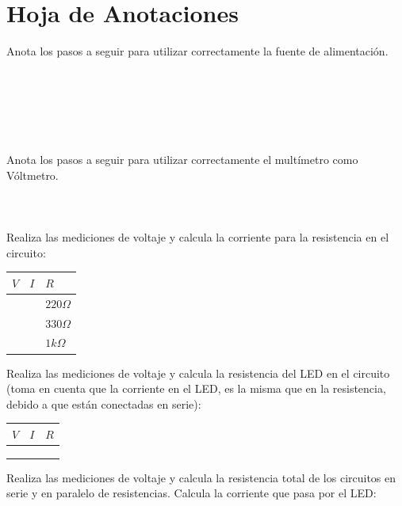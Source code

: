 \clearpage
\section{Hoja de Anotaciones}
	Anota los pasos a seguir para utilizar correctamente la fuente de alimentación. \\ \\ \\ \\ \\ \\ \\

	Anota los pasos a seguir para utilizar correctamente el multímetro como Vóltmetro. \\ \\ \\ \\

	Realiza las mediciones de voltaje y calcula la corriente para la resistencia en el circuito:

	\begin{center}
		\begin{tabular}{|p{1.5cm}|p{1.5cm}|p{1.5cm}|}
			\hline
			$V$ & $I$ & $R$          \\
			\hline
			    &     & $220 \Omega$ \\
			\hline
			    &     & $330 \Omega$ \\
			\hline
			    &     & $1 k \Omega$ \\
			\hline
		\end{tabular}
	\end{center}

	Realiza las mediciones de voltaje y calcula la resistencia del LED en el circuito (toma en cuenta que la corriente en el LED, es la misma que en la resistencia, debido a que están conectadas en serie):

	\begin{center}
		\begin{tabular}{|p{1.5cm}|p{1.5cm}|p{1.5cm}|}
			\hline
			$V$ & $I$ & $R$ \\
			\hline
			    &     &     \\
			\hline
			    &     &     \\
			\hline
			    &     &     \\
			\hline
		\end{tabular}
	\end{center}

	Realiza las mediciones de voltaje y calcula la resistencia total de los circuitos en serie y en paralelo de resistencias. Calcula la corriente que pasa por el LED:

